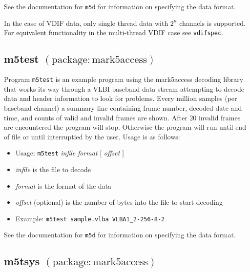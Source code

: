See the documentation for {\tt m5d} for information on specifying the data format.

In the case of VDIF data, only single thread data with $2^n$ channels is supported.
For equivalent functionality in the multi-thread VDIF case see {\tt vdifspec}.






\subsection{m5test {\small $\mathrm{(package: mark5access)}$}} \label{sec:m5test}

Program {\tt m5test} is an example program using the mark5access decoding library that works its way through a VLBI baseband data stream attempting to decode data and header information to look for problems.
Every million samples (per baseband channel) a summary line containing frame number, decoded date and time, and counts of valid and invalid frames are shown.
After 20 invalid frames are encountered the program will stop.  
Otherwise the program will run until end of file or until interruptied by the user.
Usage is as follows:

\begin{itemize}
\item[] Usage: {\tt m5test} {\em infile} {\em format} $[$ {\em offset} $]$ 
\item[] {\em infile} is the file to decode
\item[] {\em format} is the format of the data
\item[] {\em offset} (optional) is the number of bytes into the file to start decoding
\item[] Example: {\tt m5test sample.vlba VLBA1\_2-256-8-2}
\end{itemize}

See the documentation for {\tt m5d} for information on specifying the data format.











\subsection{m5tsys {\small $\mathrm{(package: mark5access)}$}} \label{sec:tsysal}







